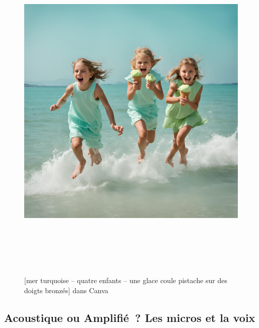 \documentclass[
]{article}
\begin{document}
\begin{figure}
\centering
\includegraphics[width=17cm,height=17cm]{../assets/Pictures/100002010000043800000438C6D70231BDF286FC.png}
\caption{{[}mer turquoise -- quatre enfants -- une glace coule pistache sur des doigts bronzés{]} dans Canva}\label{fig:fig-1-8}
\end{figure}

\subsection{Acoustique ou Amplifié~? Les micros et la voix}\label{acoustique-ou-amplifiuxe9-les-micros-et-la-voix}
\end{document}
